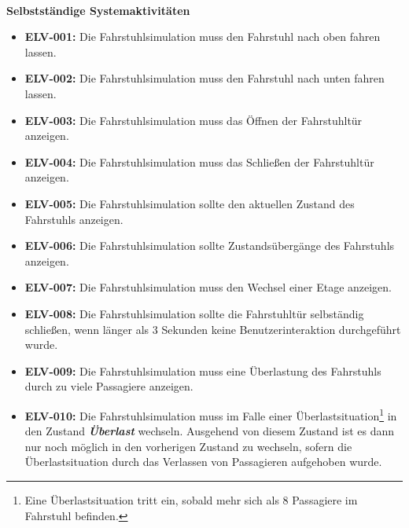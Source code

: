 \paragraph{}
\textbf{Selbstständige Systemaktivitäten}
\begin{itemize}
	\item \textbf{ELV-001:} \newline
		Die Fahrstuhlsimulation muss den Fahrstuhl nach oben fahren lassen.
	\item \textbf{ELV-002:} \newline
		Die Fahrstuhlsimulation muss den Fahrstuhl nach unten fahren lassen.
	\item \textbf{ELV-003:} \newline
		Die Fahrstuhlsimulation muss das Öffnen der Fahrstuhltür anzeigen.
	\item \textbf{ELV-004:} \newline
		Die Fahrstuhlsimulation muss das Schließen der Fahrstuhltür anzeigen.
	\item \textbf{ELV-005:} \newline
		Die Fahrstuhlsimulation sollte den aktuellen Zustand des Fahrstuhls anzeigen.
	\item \textbf{ELV-006:} \newline
		Die Fahrstuhlsimulation sollte Zustandsübergänge des Fahrstuhls anzeigen.
	\item \textbf{ELV-007:} \newline
		Die Fahrstuhlsimulation muss den Wechsel einer Etage anzeigen.
	\item \textbf{ELV-008:} \newline
		Die Fahrstuhlsimulation sollte die Fahrstuhltür selbständig schließen, wenn 
		länger als 3 Sekunden keine Benutzerinteraktion durchgeführt wurde.
	\item \textbf{ELV-009:} \newline
		Die Fahrstuhlsimulation muss eine Überlastung des Fahrstuhls durch zu 
		viele Passagiere anzeigen.
		\newline
		
	\item \textbf{ELV-010:} \newline
		Die Fahrstuhlsimulation muss im Falle einer Überlastsituation\footnote{Eine Überlastsituation tritt ein, sobald mehr sich als 8 Passagiere im Fahrstuhl befinden.} in den Zustand \textit{\textbf{Überlast}} wechseln. Ausgehend von diesem Zustand  ist es dann nur noch möglich in den vorherigen Zustand zu wechseln, sofern die Überlastsituation durch das Verlassen von Passagieren aufgehoben wurde.
\end{itemize}

